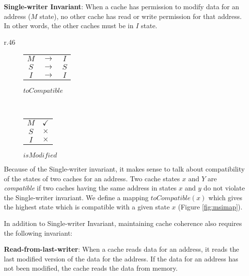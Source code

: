 \textbf{Single-writer Invariant}: When a cache has permission to modify data for
an address ($M$ state), no other cache has read or write permission for that
address. In other words, the other caches must be in $I$ state.
\label{singleWriter}

\begin{wrapfigure}{r}{.46\linewidth}
\begin{subfigure}{.27\linewidth}
\centering
\begin{tabular}{|ccc|}
\hline
$M$ & $\rightarrow$ & $I$\\
$S$ & $\rightarrow$ & $S$\\
$I$ & $\rightarrow$ & $I$\\
\hline
\end{tabular}
\caption*{$toCompatible$}
\label{toCompat}
\end{subfigure}
~~~~~~~~~~~~~~
\begin{subfigure}{.21\linewidth}
\centering
\begin{tabular}{|c|c|}
\hline
$M$ & $\checkmark$\\
$S$ & $\times$\\
$I$ & $\times$\\
\hline
\end{tabular}
\caption*{$isModified$}
\label{isModified}
\end{subfigure}
\caption{$toCompatible$ and $isModified$ mappings}
\label{fig:msimap}
\end{wrapfigure}

Because of the Single-writer invariant, it makes sense to talk about
compatibility of the states of two caches for an address. Two cache states $x$
and $Y$ are \emph{compatible} if two caches having the same address in states
$x$ and $y$ do not violate the Single-writer invariant. We define a mapping
$toCompatible(x)$ which gives the highest state which is compatible with a given
state $x$ (Figure \ref{fig:msimap}).

In addition to Single-writer Invariant, maintaining cache coherence also
requires the following invariant:

\textbf{Read-from-last-writer}: When a cache reads data for an address, it reads
the last modified version of the data for the address. If the data for an
address has not been modified, the cache reads the data from memory.

